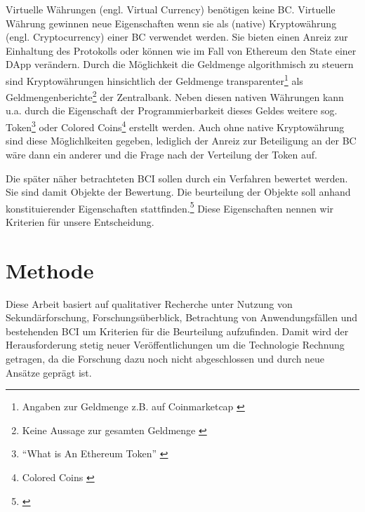 Virtuelle Währungen (engl. Virtual Currency) benötigen keine \gls{BC}.
Virtuelle Währung gewinnen neue Eigenschaften wenn sie als (native) Kryptowährung (engl. Cryptocurrency) einer \gls{BC} verwendet werden.
Sie bieten einen Anreiz zur Einhaltung des Protokolls oder können wie im Fall von Ethereum den State einer \gls{DApp} verändern.
Durch die Möglichkeit die Geldmenge algorithmisch zu steuern sind Kryptowährungen hinsichtlich der Geldmenge transparenter\footnote{Angaben zur Geldmenge z.B. auf Coinmarketcap \autocite{w:cmc}} als Geldmengenberichte\footnote{Keine Aussage zur gesamten Geldmenge \autocite{w:ecb-moneydev}} der Zentralbank.
Neben diesen nativen Währungen kann u.a. durch die Eigenschaft der Programmierbarkeit dieses Geldes weitere sog. Token\footnote{\enquote{What is An Ethereum Token} \autocite{w:eth-token}} oder Colored Coins\footnote{Colored Coins \autocite{b:mastering-bitcoin}%
} erstellt werden.
Auch ohne native Kryptowährung sind diese Möglichlkeiten gegeben, lediglich der Anreiz zur Beteiligung an der \gls{BC} wäre dann ein anderer und die Frage nach der Verteilung der Token auf.

Die später näher betrachteten \gls{BCI} sollen durch ein Verfahren bewertet werden.
Sie sind damit Objekte der Bewertung.
Die beurteilung der Objekte soll anhand konstituierender Eigenschaften stattfinden.\footnote{\cite{b:strassert:entscheidungen}}
Diese Eigenschaften nennen wir Kriterien für unsere Entscheidung.

\section{Methode}

Diese Arbeit basiert auf qualitativer Recherche unter Nutzung von Sekundärforschung, Forschungsüberblick, Betrachtung von Anwendungsfällen und bestehenden \gls{BCI} um Kriterien für die Beurteilung aufzufinden.
Damit wird der Herausforderung stetig neuer Veröffentlichungen um die Technologie Rechnung getragen, da die Forschung dazu noch nicht abgeschlossen und durch neue Ansätze geprägt ist. 


